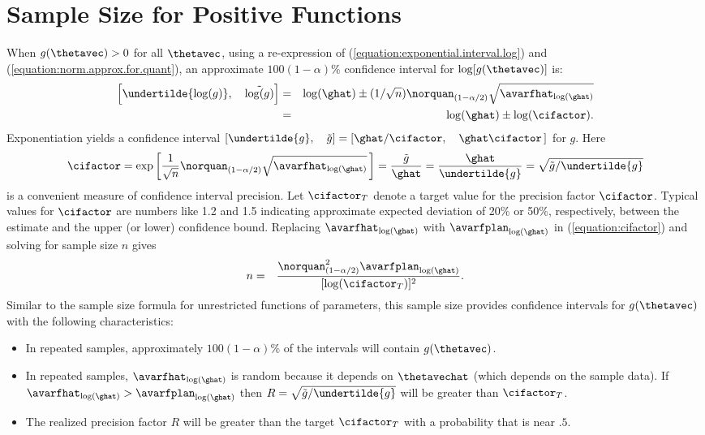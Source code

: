 \section{Sample Size for Positive Functions}
\label{section:sample.size.pos}
When $g(\thetavec) > 0$ for all $\thetavec$, using a re-expression of
(\ref{equation:exponential.interval.log}) and
(\ref{equation:norm.approx.for.quant}), an approximate
$100(1-\alpha)\%$ confidence interval for $\log[g(\thetavec)]$ is:
\begin{eqnarray*}
	\left [ \undertilde{\log(g)}, \quad \tilde{\log(g)} \right] &=& 
	\log(\ghat) \pm 
	(1/\sqrt{n})
\norquan_{(1-\alpha/2)}\sqrt{\avarfhat_{\log(\ghat)}}\\
 &=& \log(\ghat) \pm \log(\cifactor).
\end{eqnarray*}
Exponentiation yields a confidence interval 
$[ \undertilde{g}, \quad \tilde{g} ]=[\ghat/\cifactor, \quad \ghat
\cifactor \, ]$
for $g$. 
Here
\begin{equation}
\label{equation:cifactor}
\cifactor=\exp \left [\frac{1}{\sqrt{n}} \norquan_{(1-\alpha/2)}
\sqrt{\avarfhat_{\log(\ghat)}} \, \right ]=\frac{\tilde{g}}{\ghat}
=\frac{\ghat}{\undertilde{g}} = \sqrt{\tilde{g}/\undertilde{g}}
\end{equation}
is a convenient measure of confidence interval precision.  Let
$\cifactor_{T}$ denote a target value for the precision factor
$\cifactor$.  Typical values for $\cifactor$ are numbers like 1.2 and
1.5 indicating approximate expected deviation of 20\% or 50\%,
respectively, between the estimate and the upper (or lower) confidence
bound. Replacing $\avarfhat_{\log(\ghat)}$ with
$\avarfplan_{\log(\ghat)}$ in (\ref{equation:cifactor}) and solving
for sample size $n$ gives
\begin{eqnarray}
\label{equation:n.for.positive}
	n&=&\frac{\norquan_{(1-\alpha/2)}^{2} 
	\avarfplan_{\log(\ghat)}}{[\log(\cifactor_{T})]^2}.
\end{eqnarray}
Similar to the sample size formula for unrestricted functions of
parameters, this sample size provides confidence intervals for
$g(\thetavec)$ with the following characteristics:
\begin{itemize}
\item 
In repeated samples, approximately $100(1-\alpha)\%$ of the intervals
will contain $g(\thetavec)$.
\item	
In repeated samples, $\avarfhat_{\log({\ghat})}$ is random because it
depends on $\thetavechat$ (which depends on the sample data).  If
$\avarfhat_{\log({\ghat})} > \avarfplan_{\log({\ghat})}$ then
$R=\sqrt{\tilde{g}/\undertilde{g}}$ will be greater than
$\cifactor_{T}$.
\item
The realized precision factor $R$ will be greater than the target
$\cifactor_{T}$ with a probability that is near $.5$.
\end{itemize}

